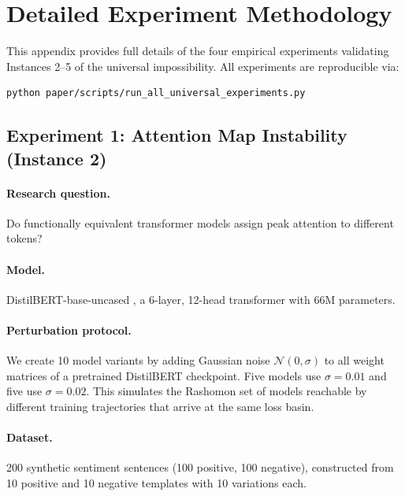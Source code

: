 \documentclass[11pt,a4paper]{article}
\begin{document}
\section{Detailed Experiment Methodology}
\label{app:experiments}

This appendix provides full details of the four empirical experiments
validating Instances 2--5 of the universal impossibility.  All experiments
are reproducible via:
\begin{verbatim}
python paper/scripts/run_all_universal_experiments.py
\end{verbatim}

\subsection{Experiment 1: Attention Map Instability (Instance 2)}
\label{app:exp-attention}

\paragraph{Research question.}
Do functionally equivalent transformer models assign peak attention to
different tokens?

\paragraph{Model.}
DistilBERT-base-uncased \citep{sanh2019distilbert}, a 6-layer, 12-head
transformer with 66M parameters.

\paragraph{Perturbation protocol.}
We create 10 model variants by adding Gaussian noise $\mathcal{N}(0, \sigma)$
to all weight matrices of a pretrained DistilBERT checkpoint.  Five models use
$\sigma = 0.01$ and five use $\sigma = 0.02$.  This simulates the Rashomon set
of models reachable by different training trajectories that arrive at the same
loss basin.

\paragraph{Dataset.}
200 synthetic sentiment sentences (100 positive, 100 negative), constructed
from 10 positive and 10 negative templates with 10 variations each.
\end{document}
